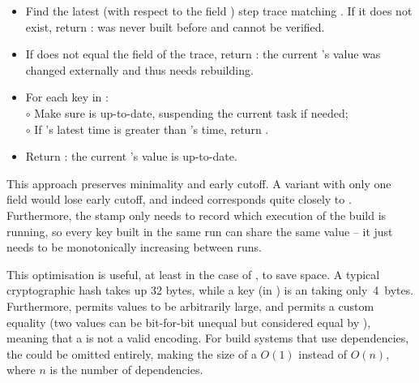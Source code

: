 \begin{itemize}
\item Find the latest (with respect to the field ) step trace matching
  . If it does not exist, return :  was never built
  before and cannot be verified.
\item If  does not equal the  field of the trace, return
  : the current 's value was changed externally and thus needs
  rebuilding.
\item For each key  in :\\
  $\circ$ Make sure  is up-to-date, suspending the current task if needed;\\
  $\circ$ If 's latest  time is greater than 's
     time, return .
\item Return : the current 's value is up-to-date.
\end{itemize}

\noindent
This approach preserves minimality and early cutoff. A variant with only one
 field would lose early cutoff, and indeed corresponds quite closely to
\Make. Furthermore, the  stamp only needs to record which execution of
the build is running, so every key built in the same run can share the same
 value -- it just needs to be monotonically increasing between runs.

This optimisation is useful, at least in the case of \Shake, to save space. A
typical cryptographic hash takes up 32 bytes, while a key (in \Shake) is an
 taking only~4~bytes. Furthermore, \Shake permits values to be
arbitrarily large, and permits a custom equality (two values can be bit-for-bit
unequal but considered equal by \Shake), meaning that a  is not a valid
encoding. For build systems that use  dependencies, the
 could be omitted entirely, making the size of a 
$O(1)$ instead of $O(n)$, where $n$ is the number of dependencies.

